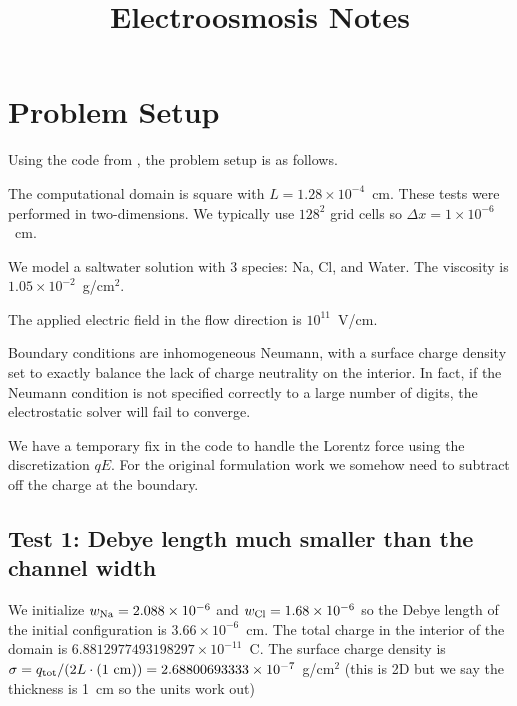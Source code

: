 \documentclass[final]{siamltex}
\begin{document}
\title{Electroosmosis Notes}

\maketitle

\section{Problem Setup}
Using the code from \cite{LowMachElectro}, the problem setup is as follows.

The computational domain is square with $L=1.28\times 10^{-4}$~cm.
These tests were performed in two-dimensions.  We typically use
$128^2$ grid cells so $\Delta x = 1\times 10^{-6}$~cm.

We model a saltwater solution with 3 species: Na, Cl, and Water.
The viscosity is $1.05\times 10^{-2}$~g/cm$^2$.

The applied electric field in the flow direction is $10^{11}$~V/cm.

Boundary conditions are inhomogeneous Neumann, with a surface charge
density set to exactly balance the lack of charge neutrality on the interior.
In fact, if the Neumann condition is not specified correctly to a large number
of digits, the electrostatic solver will fail to converge.

We have a temporary fix in the code to handle the Lorentz force using the
discretization $qE$.  For the original formulation work we somehow need to
subtract off the charge at the boundary.

\subsection{Test 1: Debye length much smaller than the channel width}
We initialize $w_{\rm Na} = 2.088\times 10^{-6}$ and
$w_{\rm Cl} = 1.68\times 10^{-6}$ so the Debye length of the initial
configuration is $3.66\times 10^{-6}$~cm.  The total charge in the interior
of the domain is $6.8812977493198297\times 10^{-11}$~C.  The surface charge density
is $\sigma = q_{\rm tot} / (2L\cdot (1~{\rm cm})) = 2.68800693333\times 10^{-7}$~g/cm$^2$
(this is 2D but we say the thickness is 1~cm so the units work out)
\end{document}
